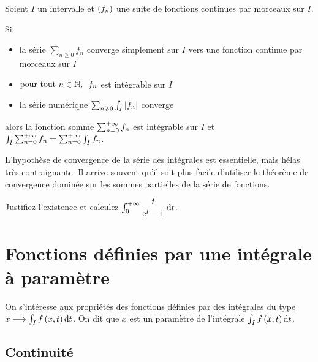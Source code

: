 \begin{theo}
Soient \(I\) un intervalle et \(\left(f_n\right)\) une suite de fonctions continues par morceaux sur \(I\).

Si

\begin{itemize}
    \item la série \(\sum_{n\geq0}f_n\) converge simplement sur \(I\) vers une fonction continue par morceaux sur \(I\) \\
    \item \(\quantifs{\tpt n\in\N}f_n\) est intégrable sur \(I\) \\
    \item la série numérique \(\sum_{n\geqslant0}\int_I\left\lvert f_n\right\rvert\) converge
\end{itemize}

alors la fonction somme \(\sum_{n=0}^{+\infty}f_n\) est intégrable sur \(I\) et \(\int_I\sum_{n=0}^{+\infty}f_n=\sum_{n=0}^{+\infty}\int_If_n\).
\end{theo}

L'hypothèse de convergence de la série des intégrales est essentielle, mais hélas très contraignante. Il arrive souvent qu'il soit plus facile d'utiliser le théorème de convergence dominée sur les sommes partielles de la série de fonctions.

\begin{exo}
Justifiez l'existence et calculez \(\int_0^{\pinf}\dfrac{t}{\e{t}-1}\odif{t}\).
\end{exo}

\section{Fonctions définies par une intégrale à paramètre}

On s'intéresse aux propriétés des fonctions définies par des intégrales du type \(x\mapsto\int_If\paren{x,t}\odif{t}\). On dit que \(x\) est un paramètre de l'intégrale \(\int_If\paren{x,t}\odif{t}\).

\subsection{Continuité}


